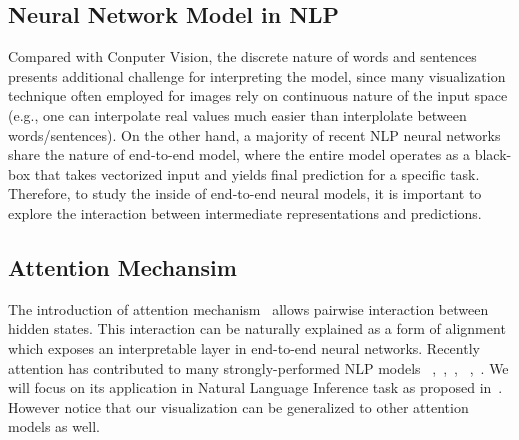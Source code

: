 \subsection{Neural Network Model in NLP}


Compared with Conputer Vision, the discrete nature of words and sentences
presents additional challenge for
interpreting the model, since many visualization technique often employed
for images rely on continuous nature of the input space (e.g., one can interpolate
real values much easier than interplolate between words/sentences).
%
On the other hand, a majority of recent NLP neural networks share the nature of
end-to-end model, where the entire model operates as a black-box that takes
vectorized input and yields final prediction for a specific task.
Therefore, to study the inside of end-to-end neural models, it is important to
explore the interaction between intermediate representations and predictions.

\subsection{Attention Mechansim}
\label{sec:attention}
The introduction of attention mechanism~\cite{bahdanau2014neural} allows
pairwise interaction between hidden states. This interaction can be naturally explained
as a form of alignment which exposes an interpretable layer in end-to-end neural networks.
Recently attention has contributed to many strongly-performed NLP models
~\cite{parikh2016emnlp},~\cite{rush2015neural},~\cite{yang2016hierarchical},
~\cite{seo2016bidirectional},~\cite{schwartz2017high}.
We will focus on its application in Natural Language Inference task as proposed in~\cite{parikh2016emnlp}.
However notice that our visualization can be generalized to other attention models as well.

